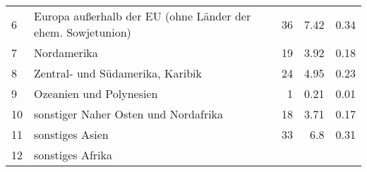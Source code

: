 \begin{longtable}{lXrrr}
     6 &
     \multicolumn{1}{X}{ Europa außerhalb der EU (ohne Länder der ehem. Sowjetunion)   } &


       \num{36} &
       \num[round-mode=places,round-precision=2]{7.42} &
         \num[round-mode=places,round-precision=2]{0.34} \\

     7 &
     \multicolumn{1}{X}{ Nordamerika   } &


       \num{19} &
       \num[round-mode=places,round-precision=2]{3.92} &
         \num[round-mode=places,round-precision=2]{0.18} \\

     8 &
     \multicolumn{1}{X}{ Zentral- und Südamerika, Karibik   } &


       \num{24} &
       \num[round-mode=places,round-precision=2]{4.95} &
         \num[round-mode=places,round-precision=2]{0.23} \\

     9 &
     \multicolumn{1}{X}{ Ozeanien und Polynesien   } &


       \num{1} &
       \num[round-mode=places,round-precision=2]{0.21} &
         \num[round-mode=places,round-precision=2]{0.01} \\

     10 &
     \multicolumn{1}{X}{ sonstiger Naher Osten und Nordafrika   } &


       \num{18} &
       \num[round-mode=places,round-precision=2]{3.71} &
         \num[round-mode=places,round-precision=2]{0.17} \\

     11 &
     \multicolumn{1}{X}{ sonstiges Asien   } &


       \num{33} &
       \num[round-mode=places,round-precision=2]{6.8} &
         \num[round-mode=places,round-precision=2]{0.31} \\

     12 &
     \multicolumn{1}{X}{ sonstiges Afrika   } &



\end{longtable}
